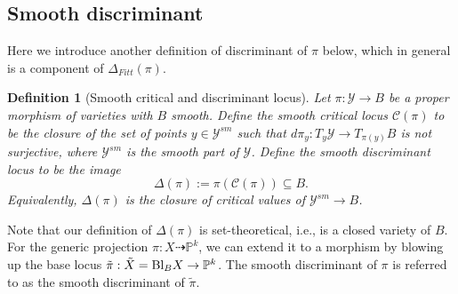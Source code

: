 \documentclass[12pt]{amsart}
\newtheorem{definition}[theorem]{Definition}
\begin{document}
\subsection{Smooth discriminant}
Here we introduce another definition of discriminant of $\pi$ below, which in general is a component of $\Delta_{Fitt}(\pi)$.
\begin{definition}[Smooth critical and discriminant locus]\normalfont \label{def_discriminant}
Let $\pi:\mathcal Y\to B$ be a proper morphism of varieties with $B$ smooth.
Define the \textit{smooth critical locus} $\mathcal C(\pi)$ to be the closure of the set of points $y\in \mathcal Y^{sm}$
such that $d\pi_y:T_y\mathcal Y\to T_{\pi(y)}B$ is not surjective, where $\mathcal Y^{sm}$ is the smooth part of $\mathcal Y$.
Define the \textit{smooth discriminant locus} to be the image  $$\Delta(\pi):=\pi(\mathcal C(\pi))\subseteq B.$$
Equivalently, $\Delta(\pi)$ is the closure of critical values of $\mathcal Y^{sm}\to B$.

\end{definition}
Note that our definition of $\Delta(\pi)$ is set-theoretical, i.e., is a closed variety of $B$. For the generic projection $\pi:X\dashrightarrow \mathbb P^k$, we can extend it to a morphism by blowing up the base locus $\tilde{\pi}:\tilde{X}=\textup{Bl}_BX\to \mathbb P^k$. The smooth discriminant of $\pi$ is referred to as the smooth discriminant of $\tilde{\pi}$.
\end{document}
